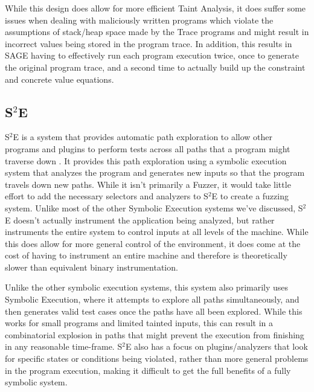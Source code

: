 While this design does allow for more efficient Taint Analysis, it does suffer
some issues when dealing with maliciously written programs which violate the
assumptions of stack/heap space made by the Trace programs and might result in
incorrect values being stored in the program trace. In addition, this results in
SAGE having to effectively run each program execution twice, once to generate
the original program trace, and a second time to actually build up the
constraint and concrete value equations.

\subsection{S$^2$E}
S$^2$E is a system that provides automatic path exploration to allow other
programs and plugins to perform tests across all paths that a program might
traverse down \cite{s2e}. It provides this path exploration using a symbolic
execution system that analyzes the program and generates new inputs so that the
program travels down new paths. While it isn't primarily a Fuzzer, it would take
little effort to add the necessary selectors and analyzers to S$^2$E to create a
fuzzing system. Unlike most of the other Symbolic Execution systems we've
discussed, S$^2$E doesn't actually instrument the application being analyzed,
but rather instruments the entire system to control inputs at all levels of the
machine. While this does allow for more general control of the environment, it
does come at the cost of having to instrument an entire machine and therefore is
theoretically slower than equivalent binary instrumentation. 

Unlike the other symbolic execution systems, this system also primarily uses
Symbolic Execution, where it attempts to explore all paths simultaneously, and
then generates valid test cases once the paths have all been explored. While
this works for small programs and limited tainted inputs, this can result in a
combinatorial explosion in paths that might prevent the execution from finishing
in any reasonable time-frame. S$^2$E also has a focus on plugins/analyzers that
look for specific states or conditions being violated, rather than more general
problems in the program execution, making it difficult to get the full benefits
of a fully symbolic system.
